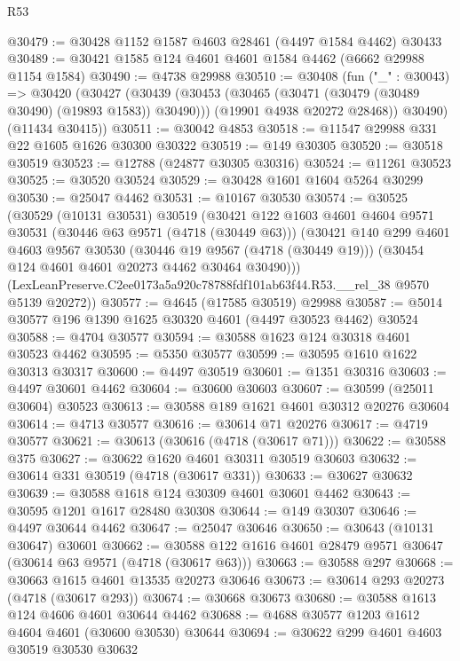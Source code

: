 \begin{lexlean}{R53}
\begin{coremodule}
@30479 := @30428 @1152 @1587 @4603 @28461 (@4497 @1584 @4462) @30433
@30489 := @30421 @1585 @124 @4601 @4601 @1584 @4462 (@6662 @29988 @1154 @1584)
@30490 := @4738 @29988
@30510 := @30408
    (fun ("_" : @30043) =>
    @30420
      (@30427
        (@30439
          (@30453 (@30465 (@30471 (@30479 (@30489 @30490) (@19893 @1583)) @30490)))
          (@19901 @4938 @20272 @28468))
        @30490)
      (@11434 @30415))
@30511 := @30042 @4853
@30518 := @11547 @29988 @331 @22 @1605 @1626 @30300 @30322
@30519 := @149 @30305
@30520 := @30518 @30519
@30523 := @12788 (@24877 @30305 @30316)
@30524 := @11261 @30523
@30525 := @30520 @30524
@30529 := @30428 @1601 @1604 @5264 @30299
@30530 := @25047 @4462
@30531 := @10167 @30530
@30574 := @30525
    (@30529
      (@10131 @30531)
      @30519
      (@30421
        @122
        @1603
        @4601
        @4604
        @9571
        @30531
        (@30446 @63 @9571 (@4718 (@30449 @63)))
        (@30421
          @140
          @299
          @4601
          @4603
          @9567
          @30530
          (@30446 @19 @9567 (@4718 (@30449 @19)))
          (@30454 @124 @4601 @4601 @20273 @4462 @30464 @30490)))
      (LexLeanPreserve.C2ee0173a5a920c78788fdf101ab63f44.R53.__rel_38 @9570 @5139 @20272))
@30577 := @4645 (@17585 @30519) @29988
@30587 := @5014 @30577 @196 @1390 @1625 @30320 @4601 (@4497 @30523 @4462) @30524
@30588 := @4704 @30577
@30594 := @30588 @1623 @124 @30318 @4601 @30523 @4462
@30595 := @5350 @30577
@30599 := @30595 @1610 @1622 @30313 @30317
@30600 := @4497 @30519
@30601 := @1351 @30316
@30603 := @4497 @30601 @4462
@30604 := @30600 @30603
@30607 := @30599 (@25011 @30604) @30523
@30613 := @30588 @189 @1621 @4601 @30312 @20276 @30604
@30614 := @4713 @30577
@30616 := @30614 @71 @20276
@30617 := @4719 @30577
@30621 := @30613 (@30616 (@4718 (@30617 @71)))
@30622 := @30588 @375
@30627 := @30622 @1620 @4601 @30311 @30519 @30603
@30632 := @30614 @331 @30519 (@4718 (@30617 @331))
@30633 := @30627 @30632
@30639 := @30588 @1618 @124 @30309 @4601 @30601 @4462
@30643 := @30595 @1201 @1617 @28480 @30308
@30644 := @149 @30307
@30646 := @4497 @30644 @4462
@30647 := @25047 @30646
@30650 := @30643 (@10131 @30647) @30601
@30662 := @30588 @122 @1616 @4601 @28479 @9571 @30647 (@30614 @63 @9571 (@4718 (@30617 @63)))
@30663 := @30588 @297
@30668 := @30663 @1615 @4601 @13535 @20273 @30646
@30673 := @30614 @293 @20273 (@4718 (@30617 @293))
@30674 := @30668 @30673
@30680 := @30588 @1613 @124 @4606 @4601 @30644 @4462
@30688 := @4688 @30577 @1203 @1612 @4604 @4601 (@30600 @30530) @30644
@30694 := @30622 @299 @4601 @4603 @30519 @30530 @30632

\end{coremodule}
\end{lexlean}
